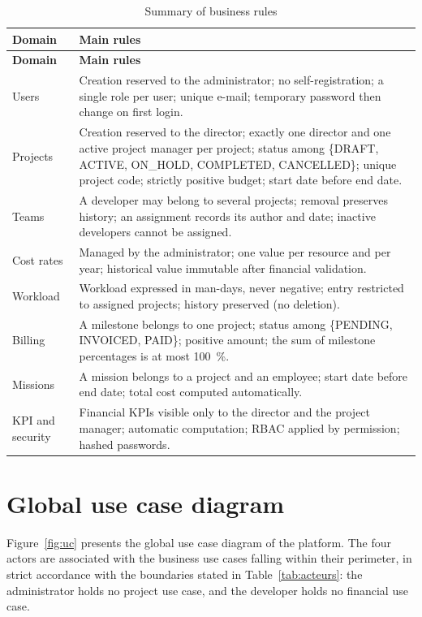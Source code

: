 \begin{longtable}{|m{3.5cm}|m{11cm}|}
\caption{Summary of business rules}\label{tab:regles-gestion}\\
\hline
\textbf{Domain} & \textbf{Main rules} \\
\hline
\endfirsthead
\hline
\textbf{Domain} & \textbf{Main rules} \\
\hline
\endhead
\endfoot
\endlastfoot
\hline
Users & Creation reserved to the administrator; no self-registration; a single role per user;
unique e-mail; temporary password then change on first login. \\
\hline
Projects & Creation reserved to the director; exactly one director and one active project manager
per project; status among \{DRAFT, ACTIVE, ON\_HOLD, COMPLETED, CANCELLED\}; unique project code;
strictly positive budget; start date before end date. \\
\hline
Teams & A developer may belong to several projects; removal preserves history; an assignment
records its author and date; inactive developers cannot be assigned. \\
\hline
Cost rates & Managed by the administrator; one value per resource and per year; historical value
immutable after financial validation. \\
\hline
Workload & Workload expressed in man-days, never negative; entry restricted to assigned projects;
history preserved (no deletion). \\
\hline
Billing & A milestone belongs to one project; status among \{PENDING, INVOICED, PAID\}; positive
amount; the sum of milestone percentages is at most 100~\%. \\
\hline
Missions & A mission belongs to a project and an employee; start date before end date; total cost
computed automatically. \\
\hline
KPI and security & Financial KPIs visible only to the director and the project manager; automatic
computation; RBAC applied by permission; hashed passwords. \\
\hline
\end{longtable}

\section{Global use case diagram}
Figure~\ref{fig:uc} presents the global use case diagram of the platform. The four actors are
associated with the business use cases falling within their perimeter, in strict accordance with
the boundaries stated in Table~\ref{tab:acteurs}: the administrator holds no project use case, and
the developer holds no financial use case.

